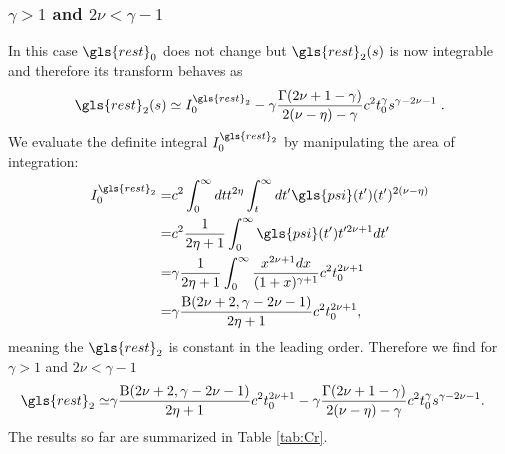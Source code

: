 \subsubsection{$\gamma>1$ and $2\nu<\gamma-1$}
In this case $\gls{rest}_0$ does not change but $\gls{rest}_2(s)$ is now integrable and therefore its transform behaves as
\begin{equation}
\gls{rest}_2(s) \simeq I^{\gls{rest}_2}_0 - \gamma \frac{\Gamma(2\nu+1-\gamma)}{2(\nu-\eta)-\gamma} c^2 t_0^\gamma s^{\gamma - 2\nu-1 } \; .
\end{equation}
We evaluate the definite integral $I^{\gls{rest}_2}_0$ by manipulating the area of integration:
\begin{align}
 I^{\gls{rest}_2}_0 =& c^2\int_0^\infty dt  t^{2\eta} \int_t^\infty dt' \gls{psi}(t') (t')^{2(\nu-\eta)} \\
  =& c^2\frac{1}{2\eta+1} \int_0^\infty \gls{psi}(t') t'^{2\nu+1} dt' \nonumber \\ 
 =& \gamma\frac{1}{2\eta+1} \int_0^\infty \frac{x^{2\nu+1}dx}{(1+x)^{\gamma+1}}c^2 t_0^{2\nu+1}  \nonumber \\
=& \gamma  \frac{\mathrm{B}(2\nu +2, \gamma - 2\nu -1)}{2\eta+1}  c^2 t_0^{2\nu+1} , 
\end{align}
meaning the $\gls{rest}_2$ is constant in the leading order. Therefore we find for $\gamma>1$ and $2\nu<\gamma-1$
%
\begin{align}
\gls{rest}_2 \simeq & \gamma \frac{\mathrm{B}(2\nu +2, \gamma - 2\nu -1)}{2\eta+1}  c^2 t_0^{2\nu+1}   -\gamma \frac{\Gamma(2\nu+1-\gamma)} {2(\nu-\eta)-\gamma} c^2 t_0^\gamma  s^{\gamma - 2\nu-1} .
\end{align}
%
The results so far are summarized in Table \ref{tab:Cr}.
%

